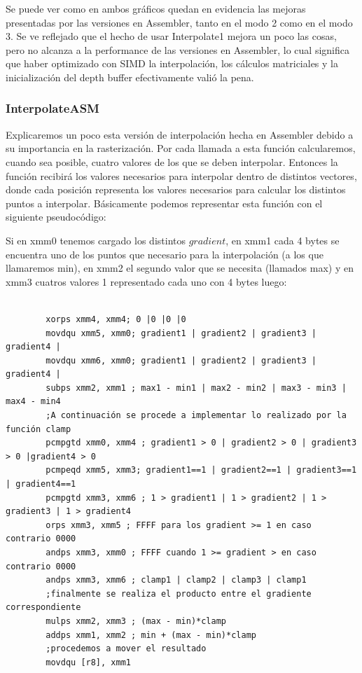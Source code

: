 \documentclass[a4paper]{article}
\begin{document}
Se puede ver como en ambos gráficos quedan en evidencia las mejoras presentadas por las versiones en Assembler, tanto en el modo 2 como en el modo 3. Se ve reflejado que el hecho de usar Interpolate1 mejora un poco las cosas, pero no alcanza a la performance de las versiones en Assembler, lo cual significa que haber optimizado con SIMD la interpolación, los cálculos matriciales y la inicialización del depth buffer efectivamente valió la pena.

\subsubsection{InterpolateASM}
Explicaremos un poco esta versión de interpolación hecha en Assembler debido a su importancia en la rasterización. Por cada llamada a esta función calcularemos, cuando sea posible, cuatro valores de los que se deben interpolar. Entonces la función recibirá los valores necesarios para interpolar dentro de distintos vectores, donde cada posición representa los valores necesarios para calcular los distintos puntos a interpolar. Básicamente podemos representar esta función con el siguiente pseudocódigo:

Si en xmm0 tenemos cargado los distintos $gradient$, en xmm1 cada 4 bytes se encuentra uno de los puntos que necesario para la interpolación (a los que llamaremos min), en xmm2 el segundo valor que se necesita (llamados max) y en xmm3 cuatros valores 1 representado cada uno con 4 bytes luego:   
\begin{verbatim}
        
        xorps xmm4, xmm4; 0 |0 |0 |0
        movdqu xmm5, xmm0; gradient1 | gradient2 | gradient3 | gradient4 |      
        movdqu xmm6, xmm0; gradient1 | gradient2 | gradient3 | gradient4 |
        subps xmm2, xmm1 ; max1 - min1 | max2 - min2 | max3 - min3 | max4 - min4 
        ;A continuación se procede a implementar lo realizado por la función clamp
        pcmpgtd xmm0, xmm4 ; gradient1 > 0 | gradient2 > 0 | gradient3 > 0 |gradient4 > 0
        pcmpeqd xmm5, xmm3; gradient1==1 | gradient2==1 | gradient3==1 | gradient4==1  
        pcmpgtd xmm3, xmm6 ; 1 > gradient1 | 1 > gradient2 | 1 > gradient3 | 1 > gradient4
        orps xmm3, xmm5 ; FFFF para los gradient >= 1 en caso contrario 0000  
        andps xmm3, xmm0 ; FFFF cuando 1 >= gradient > en caso contrario 0000
        andps xmm3, xmm6 ; clamp1 | clamp2 | clamp3 | clamp1 
        ;finalmente se realiza el producto entre el gradiente correspondiente
        mulps xmm2, xmm3 ; (max - min)*clamp
        addps xmm1, xmm2 ; min + (max - min)*clamp
        ;procedemos a mover el resultado
        movdqu [r8], xmm1
\end{verbatim}
 
\end{document}
